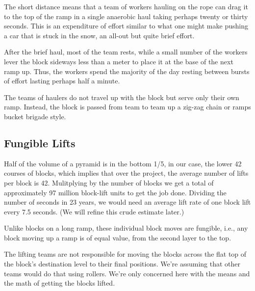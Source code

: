 \documentclass[letterpaper,11pt]{article}
\begin{document}
The short distance means that a team of workers hauling on the rope can drag it to the top of the ramp in a single 
anaerobic haul taking perhaps twenty or thirty seconds. 
This is an expenditure of effort similar to what one might make pushing a car that is stuck in the snow, an all-out but quite brief effort. 

After the brief haul, most of the team rests, while a small number of the workers lever the block sideways less than a meter to place 
it at the base of the next ramp up.  
Thus, the workers spend the majority of the day resting between bursts of effort lasting perhaps half a minute.

The teams of haulers do not travel up with the block but serve only their own ramp. 
Instead, the block is passed from team to team up a zig-zag chain or ramps bucket brigade style.


\subsection{Fungible Lifts }

Half of the volume of a pyramid is in the bottom 1/5, in our case, the lower 42 courses of blocks, which implies that
over the project, the average number of lifts per block is 42. 
Mulitplying by the number of blocks we get a total of approximately 97 million block-lift units to get the job done. 
Dividing the number of seconds in 23 years, we would need an average lift rate of one block lift every 7.5 seconds. 
(We will refine this crude estimate later.)

Unlike blocks on a long ramp, these individual block moves are fungible, i.e., any block moving up a ramp is of equal value, from the second layer to the top.

The lifting teams are not responsible for moving the blocks across the flat top of the block's destination level to their final positions. 
We're assuming that other teams would do that using rollers. We're only concerned here with the means and the math of getting the blocks lifted.
\end{document}
